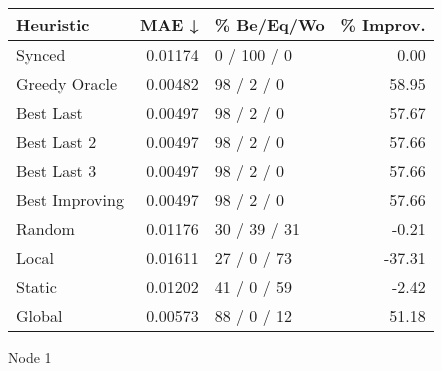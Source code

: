 \begin{tabular}{lrlr}
\toprule
\textbf{Heuristic} & \textbf{MAE ↓} & \textbf{\% Be/Eq/Wo} & \textbf{\% Improv.} \\
\midrule
            Synced &        0.01174 &          0 / 100 / 0 &                0.00 \\
     Greedy Oracle &        0.00482 &           98 / 2 / 0 &               58.95 \\
         Best Last &        0.00497 &           98 / 2 / 0 &               57.67 \\
       Best Last 2 &        0.00497 &           98 / 2 / 0 &               57.66 \\
       Best Last 3 &        0.00497 &           98 / 2 / 0 &               57.66 \\
    Best Improving &        0.00497 &           98 / 2 / 0 &               57.66 \\
            Random &        0.01176 &         30 / 39 / 31 &               -0.21 \\
             Local &        0.01611 &          27 / 0 / 73 &              -37.31 \\
            Static &        0.01202 &          41 / 0 / 59 &               -2.42 \\
            Global &        0.00573 &          88 / 0 / 12 &               51.18 \\
\bottomrule
\end{tabular}
\caption{Node 1}
\label{tab:non_lr05_le2_bs4_1}
